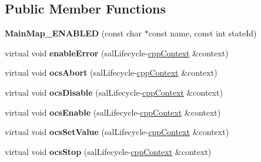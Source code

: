 \subsection*{Public Member Functions}
\begin{DoxyCompactItemize}
\item 
\hypertarget{class_main_map___e_n_a_b_l_e_d_ad3a00ff99ae36f1d094c4562e0e30497}{{\bfseries Main\-Map\-\_\-\-E\-N\-A\-B\-L\-E\-D} (const char $\ast$const name, const int state\-Id)}\label{class_main_map___e_n_a_b_l_e_d_ad3a00ff99ae36f1d094c4562e0e30497}

\item 
\hypertarget{class_main_map___e_n_a_b_l_e_d_a2cf5603cef40ed302f02e48e08c4a4f3}{virtual void {\bfseries enable\-Error} (sal\-Lifecycle-\/\hyperlink{classcpp_context}{cpp\-Context} \&context)}\label{class_main_map___e_n_a_b_l_e_d_a2cf5603cef40ed302f02e48e08c4a4f3}

\item 
\hypertarget{class_main_map___e_n_a_b_l_e_d_a55b1bd24594fb648a0283dde42bbb9da}{virtual void {\bfseries ocs\-Abort} (sal\-Lifecycle-\/\hyperlink{classcpp_context}{cpp\-Context} \&context)}\label{class_main_map___e_n_a_b_l_e_d_a55b1bd24594fb648a0283dde42bbb9da}

\item 
\hypertarget{class_main_map___e_n_a_b_l_e_d_aed12076f2daa8f7ed4aba7b290781584}{virtual void {\bfseries ocs\-Disable} (sal\-Lifecycle-\/\hyperlink{classcpp_context}{cpp\-Context} \&context)}\label{class_main_map___e_n_a_b_l_e_d_aed12076f2daa8f7ed4aba7b290781584}

\item 
\hypertarget{class_main_map___e_n_a_b_l_e_d_a0775a62bde51b04b71fa60eef9a67b2e}{virtual void {\bfseries ocs\-Enable} (sal\-Lifecycle-\/\hyperlink{classcpp_context}{cpp\-Context} \&context)}\label{class_main_map___e_n_a_b_l_e_d_a0775a62bde51b04b71fa60eef9a67b2e}

\item 
\hypertarget{class_main_map___e_n_a_b_l_e_d_ac4c7a82a404b1fd3b7b394f11b7dfeee}{virtual void {\bfseries ocs\-Set\-Value} (sal\-Lifecycle-\/\hyperlink{classcpp_context}{cpp\-Context} \&context)}\label{class_main_map___e_n_a_b_l_e_d_ac4c7a82a404b1fd3b7b394f11b7dfeee}

\item 
\hypertarget{class_main_map___e_n_a_b_l_e_d_afe087f68d6aa7402a7198b67f0b2b1e5}{virtual void {\bfseries ocs\-Stop} (sal\-Lifecycle-\/\hyperlink{classcpp_context}{cpp\-Context} \&context)}\label{class_main_map___e_n_a_b_l_e_d_afe087f68d6aa7402a7198b67f0b2b1e5}

\end{DoxyCompactItemize}
